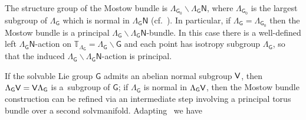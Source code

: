 \documentclass[10pt,a4paper]{amsart}
\numberwithin{equation}{section}
\def\V{{\sf V}}
\newcommand{\sfG}{\mathsf{G}}
\newcommand{\sfN}{\mathsf{N}}
\newcommand{\torus}{{\mathbb T}} %
\begin{document}
\begin{Remark}\label{rem:Mostow}
The structure group of the Mostow bundle is
$\Lambda_{\sfG_0}\backslash\Lambda_\sfG \sfN$, where $\Lambda_{\sfG_0}$ is
the largest subgroup of $\Lambda_{\sfG}$ which is normal in
$\Lambda_\sfG \sfN$ (cf.~\cite{Bock2009}).
In particular, if $\Lambda_{\sfG}=\Lambda_{\sfG_0}$ then the Mostow bundle is
a principal $\Lambda_{\sfG}\backslash\Lambda_\sfG \sfN$-bundle. In
this case there is a well-defined left $\Lambda_\sfG \sfN$-action on $\torus_{\Lambda_\sfG} =
\Lambda_\sfG\backslash\sfG$ and each point has isotropy subgroup ${\Lambda_\sfG}$,
so that the induced $\Lambda_{\sfG}\backslash\Lambda_\sfG \sfN$-action
is principal.
\end{Remark}

If the solvable Lie group $\sfG$ admits an abelian normal subgroup
$\V$, then $\Lambda_\sfG \V=\V \Lambda_\sfG$ is a~subgroup of $\sfG$; if $\Lambda_\sfG$
is normal in $\Lambda_\sfG \V$, then the Mostow bundle construction can be refined via an intermediate step
involving a principal torus bundle over a second solvmanifold.
Adapting~\cite[Theorem~3.6]{Bock2009} we have
\end{document}
